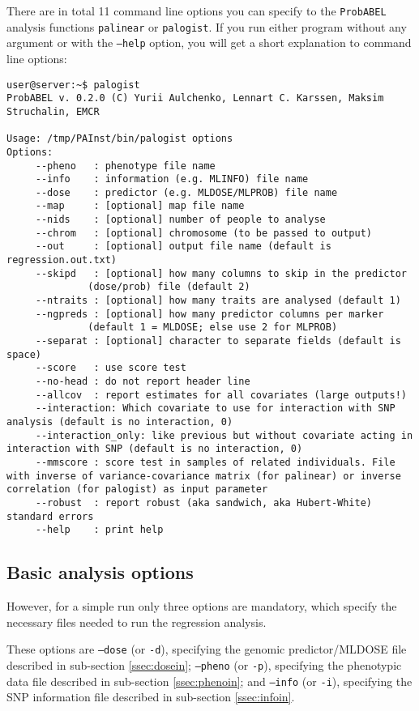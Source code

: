 \documentclass[12pt,a4paper]{article}
\newcommand{\PA}{\texttt{ProbABEL}}
\begin{document}
There are in total 11 command line options you can specify to the
\PA{} analysis functions \texttt{palinear} or \texttt{palogist}. If
you run either program without any argument or with the
\texttt{--help} option, you will get a short explanation to command
line options:
\begin{verbatim}
user@server:~$ palogist
ProbABEL v. 0.2.0 (C) Yurii Aulchenko, Lennart C. Karssen, Maksim Struchalin, EMCR

Usage: /tmp/PAInst/bin/palogist options
Options:
	 --pheno   : phenotype file name
	 --info    : information (e.g. MLINFO) file name
	 --dose    : predictor (e.g. MLDOSE/MLPROB) file name
	 --map     : [optional] map file name
	 --nids    : [optional] number of people to analyse
	 --chrom   : [optional] chromosome (to be passed to output)
	 --out     : [optional] output file name (default is regression.out.txt)
	 --skipd   : [optional] how many columns to skip in the predictor
		      (dose/prob) file (default 2)
	 --ntraits : [optional] how many traits are analysed (default 1)
	 --ngpreds : [optional] how many predictor columns per marker
		      (default 1 = MLDOSE; else use 2 for MLPROB)
	 --separat : [optional] character to separate fields (default is space)
	 --score   : use score test
	 --no-head : do not report header line
	 --allcov  : report estimates for all covariates (large outputs!)
	 --interaction: Which covariate to use for interaction with SNP analysis (default is no interaction, 0)
	 --interaction_only: like previous but without covariate acting in interaction with SNP (default is no interaction, 0)
	 --mmscore : score test in samples of related individuals. File with inverse of variance-covariance matrix (for palinear) or inverse correlation (for palogist) as input parameter
	 --robust  : report robust (aka sandwich, aka Hubert-White) standard errors
	 --help    : print help
\end{verbatim}


\subsection{Basic analysis options}
However, for a simple run only three options are mandatory, which
specify the necessary files needed to run the regression analysis.

These options are
\texttt{--dose} (or \texttt{-d}),
specifying the genomic predictor/MLDOSE file described in sub-section \ref{ssec:dosein};
\texttt{--pheno} (or \texttt{-p}),
specifying the phenotypic data file described in sub-section \ref{ssec:phenoin}; and
\texttt{--info} (or \texttt{-i}),
specifying the SNP information file described in sub-section \ref{ssec:infoin}.
\end{document}
